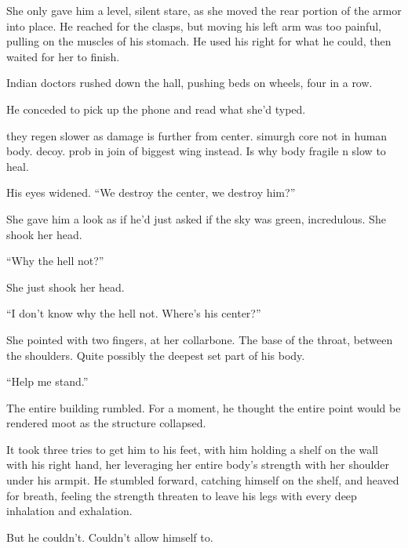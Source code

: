 She only gave him a level, silent stare, as she moved the rear portion of the armor into place.  He reached for the clasps, but moving his left arm was too painful, pulling on the muscles of his stomach.  He used his right for what he could, then waited for her to finish.



Indian doctors rushed down the hall, pushing beds on wheels, four in a row.



He conceded to pick up the phone and read what she'd typed.



they regen slower as damage is further from center.  simurgh core not in human body.  decoy.  prob in join of biggest wing instead.  Is why body fragile n slow to heal.



His eyes widened.  ``We destroy the center, we destroy him?''



She gave him a look as if he'd just asked if the sky was green, incredulous.  She shook her head.



``Why the hell not?''



She just shook her head.



``I don't know why the hell not. Where's his center?''



She pointed with two fingers, at her collarbone.  The base of the throat, between the shoulders.  Quite possibly the deepest set part of his body.



``Help me stand.''



The entire building rumbled.  For a moment, he thought the entire point would be rendered moot as the structure collapsed.



It took three tries to get him to his feet, with him holding a shelf on the wall with his right hand, her leveraging her entire body's strength with her shoulder under his armpit.  He stumbled forward, catching himself on the shelf, and heaved for breath, feeling the strength threaten to leave his legs with every deep inhalation and exhalation.



But he couldn't.  Couldn't allow himself to.



